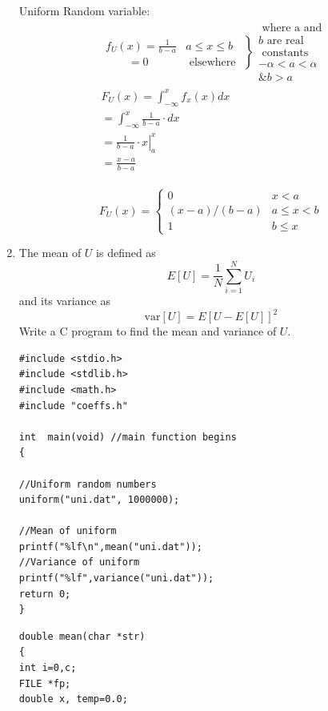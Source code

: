 \documentclass[10pt, a4paper]{article}
\providecommand{\sbrak}[1]{\ensuremath{{}\left[#1\right]}}
\begin{document}
\begin{enumerate}
\\
Uniform Random variable:
 $$
\begin{aligned}
& \left.\begin{array}{ll}
f_U(x)=\frac{1}{b-a} & a \leq x \leq b \\
\ \ \ \ \ \ \ \ \ =0 & \text { elsewhere }
\end{array}\right\} \begin{array}{l}
\text { where a and } \\
b \text { are real } \\
\text { constants } \\
-\alpha<a<\alpha \\
\& b>a
\end{array} \\
& F_U(x)=\int_{-\infty}^x f_x(x) d x \\
& =\int_{-\infty}^x \frac{1}{b-a} \cdot d x \\
& =\left.\frac{1}{b-a} \cdot x\right|_a ^x \\
& =\frac{x-a}{b-a} \\
\end{aligned}
$$

$$
F_U(x)=\left\{\begin{array}{lr}
0 & x<a \\
(x-a) /(b-a) & a \leq x<b \\
1 & b \leq x
\end{array}\right.
$$

\item
The mean of $U$ is defined as
%
\begin{equation}
E\sbrak{U} = \frac{1}{N}\sum_{i=1}^{N}U_i
\end{equation}
%
and its variance as
%
\begin{equation}
\text{var}\sbrak{U} = E\sbrak{U- E\sbrak{U}}^2 
\end{equation}
Write a C program to  find the mean and variance of $U$. 


\begin{lstlisting}
#include <stdio.h>
#include <stdlib.h>
#include <math.h>
#include "coeffs.h"

int  main(void) //main function begins
{
 
//Uniform random numbers
uniform("uni.dat", 1000000);

//Mean of uniform
printf("%lf\n",mean("uni.dat"));
//Variance of uniform
printf("%lf",variance("uni.dat"));
return 0;
}
\end{lstlisting}
\begin{lstlisting}
double mean(char *str)
{
int i=0,c;
FILE *fp;
double x, temp=0.0;


\end{lstlisting}
\end{enumerate}
\end{document}

